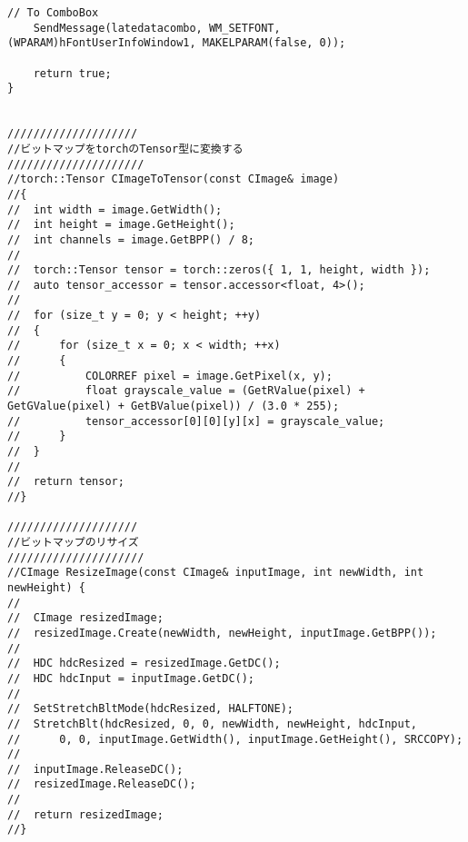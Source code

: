 \begin{lstlisting}[caption=UserInfoWindow.cpp]
	// To ComboBox
	SendMessage(latedatacombo, WM_SETFONT, (WPARAM)hFontUserInfoWindow1, MAKELPARAM(false, 0));

	return true;
}


////////////////////
//ビットマップをtorchのTensor型に変換する
/////////////////////
//torch::Tensor CImageToTensor(const CImage& image)
//{
//	int width = image.GetWidth();
//	int height = image.GetHeight();
//	int channels = image.GetBPP() / 8;
//
//	torch::Tensor tensor = torch::zeros({ 1, 1, height, width });
//	auto tensor_accessor = tensor.accessor<float, 4>();
//
//	for (size_t y = 0; y < height; ++y)
//	{
//		for (size_t x = 0; x < width; ++x)
//		{
//			COLORREF pixel = image.GetPixel(x, y);
//			float grayscale_value = (GetRValue(pixel) + GetGValue(pixel) + GetBValue(pixel)) / (3.0 * 255);
//			tensor_accessor[0][0][y][x] = grayscale_value;
//		}
//	}
//
//	return tensor;
//}

////////////////////
//ビットマップのリサイズ
/////////////////////
//CImage ResizeImage(const CImage& inputImage, int newWidth, int newHeight) {
//	
//	CImage resizedImage;
//	resizedImage.Create(newWidth, newHeight, inputImage.GetBPP());
//
//	HDC hdcResized = resizedImage.GetDC();
//	HDC hdcInput = inputImage.GetDC();
//
//	SetStretchBltMode(hdcResized, HALFTONE);
//	StretchBlt(hdcResized, 0, 0, newWidth, newHeight, hdcInput,
//		0, 0, inputImage.GetWidth(), inputImage.GetHeight(), SRCCOPY);
//
//	inputImage.ReleaseDC();
//	resizedImage.ReleaseDC();
//
//	return resizedImage;
//}
\end{lstlisting}
